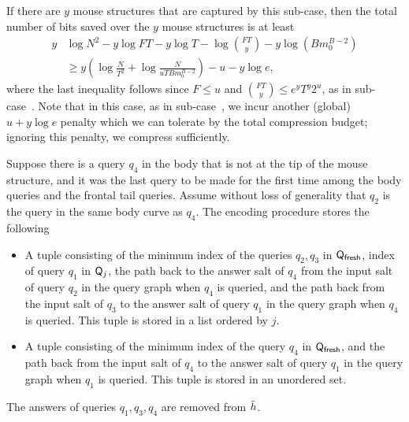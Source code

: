 { 
If there are $y$ mouse structures that are captured by this sub-case, then the total number of bits saved over the $y$ mouse structures is at least
\begin{align*}
y& \log N^2-y\log FT - y\log T -\log \binom {FT}{y} -y\log (Bm_0^{B-2}) \\ 
& \ge y\left(\log \frac{N}{T^2} +\log \frac{N}{uTBm_0^{B-2}}\right)-u -y \log e ,
\end{align*}
where the last inequality follows since $F\le u$ and $\binom{FT}{y}\le   e^yT^y 2^u$, as in sub-case~.
%
Note that in this case, as in sub-case~, we incur another (global) $u + y\log e$ penalty which we can tolerate by the total compression budget; ignoring this penalty, we compress sufficiently.



Suppose there is a query $q_4$ in the body that is not at the tip of the mouse structure, and it was the last query to be made for the first time among the body queries and the frontal tail queries. Assume without loss of generality that $q_2$ is the query in the same body curve as $q_4$. The encoding procedure stores the following
\begin{itemize}
  \item A tuple consisting of the minimum index of the queries $q_2,q_3$ in $\mathsf{Q}_\textsf{fresh}$, index of query $q_1$ in $\mathsf{Q}_j$, the path back to the answer salt of $q_4$ from the input salt of query $q_2$ in the query graph when $q_4$ is queried, and the path back from the input salt of $q_3$ to the answer salt of query $q_1$ in the query graph when $q_4$ is queried. This tuple is stored in a list ordered by $j$.
  \item A tuple consisting of the minimum index of the query $q_4$ in $\mathsf{Q}_\textsf{fresh}$, and the path back from the input salt of $q_4$ to the answer salt of query $q_1$ in the query graph when $q_1$ is queried. This tuple is stored in an unordered set.
\end{itemize}
The answers of queries $q_1,q_3,q_4$ are removed from $\tilde{h}$.


}
